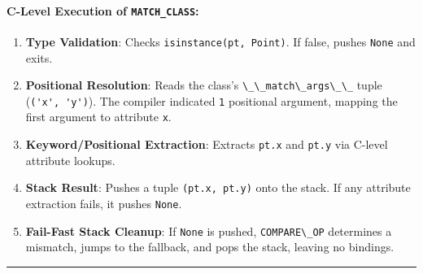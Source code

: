 \hypertarget{c-level-execution-of-match_class}{%
\paragraph{\texorpdfstring{C-Level Execution of
\texttt{MATCH\_CLASS}:}{C-Level Execution of MATCH\_CLASS:}}\label{c-level-execution-of-match_class}}

\begin{enumerate}
\def\labelenumi{\arabic{enumi}.}
\tightlist
\item
  \textbf{Type Validation}: Checks
  \passthrough{\lstinline!isinstance(pt, Point)!}. If false, pushes
  \passthrough{\lstinline!None!} and exits.
\item
  \textbf{Positional Resolution}: Reads the class's
  \passthrough{\lstinline!\_\_match\_args\_\_!} tuple
  (\passthrough{\lstinline!('x', 'y')!}). The compiler indicated
  \passthrough{\lstinline!1!} positional argument, mapping the first
  argument to attribute \passthrough{\lstinline!x!}.
\item
  \textbf{Keyword/Positional Extraction}: Extracts
  \passthrough{\lstinline!pt.x!} and \passthrough{\lstinline!pt.y!} via
  C-level attribute lookups.
\item
  \textbf{Stack Result}: Pushes a tuple
  \passthrough{\lstinline!(pt.x, pt.y)!} onto the stack. If any
  attribute extraction fails, it pushes \passthrough{\lstinline!None!}.
\item
  \textbf{Fail-Fast Stack Cleanup}: If \passthrough{\lstinline!None!} is
  pushed, \passthrough{\lstinline!COMPARE\_OP!} determines a mismatch,
  jumps to the fallback, and pops the stack, leaving no bindings.
\end{enumerate}

\begin{center}\rule{0.5\linewidth}{0.5pt}\end{center}
